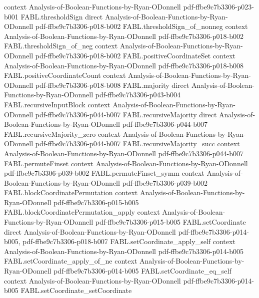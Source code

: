 \begin{theorem}
  {context}
  {Analysis-of-Boolean-Functions-by-Ryan-ODonnell}
  {pdf-ffbe9c7b3306-p023-b001}
\proofstep
  {FABL.thresholdSign}
  {direct}
  {Analysis-of-Boolean-Functions-by-Ryan-ODonnell}
  {pdf-ffbe9c7b3306-p018-b002}
\proofstep
  {FABL.thresholdSign_of_nonneg}
  {context}
  {Analysis-of-Boolean-Functions-by-Ryan-ODonnell}
  {pdf-ffbe9c7b3306-p018-b002}
\proofstep
  {FABL.thresholdSign_of_neg}
  {context}
  {Analysis-of-Boolean-Functions-by-Ryan-ODonnell}
  {pdf-ffbe9c7b3306-p018-b002}
\proofstep
  {FABL.positiveCoordinateSet}
  {context}
  {Analysis-of-Boolean-Functions-by-Ryan-ODonnell}
  {pdf-ffbe9c7b3306-p018-b008}
\proofstep
  {FABL.positiveCoordinateCount}
  {context}
  {Analysis-of-Boolean-Functions-by-Ryan-ODonnell}
  {pdf-ffbe9c7b3306-p018-b008}
\proofstep
  {FABL.majority}
  {direct}
  {Analysis-of-Boolean-Functions-by-Ryan-ODonnell}
  {pdf-ffbe9c7b3306-p043-b004}
\proofstep
  {FABL.recursiveInputBlock}
  {context}
  {Analysis-of-Boolean-Functions-by-Ryan-ODonnell}
  {pdf-ffbe9c7b3306-p044-b007}
\proofstep
  {FABL.recursiveMajority}
  {direct}
  {Analysis-of-Boolean-Functions-by-Ryan-ODonnell}
  {pdf-ffbe9c7b3306-p044-b007}
\proofstep
  {FABL.recursiveMajority_zero}
  {context}
  {Analysis-of-Boolean-Functions-by-Ryan-ODonnell}
  {pdf-ffbe9c7b3306-p044-b007}
\proofstep
  {FABL.recursiveMajority_succ}
  {context}
  {Analysis-of-Boolean-Functions-by-Ryan-ODonnell}
  {pdf-ffbe9c7b3306-p044-b007}
\proofstep
  {FABL.permuteFinset}
  {context}
  {Analysis-of-Boolean-Functions-by-Ryan-ODonnell}
  {pdf-ffbe9c7b3306-p039-b002}
\proofstep
  {FABL.permuteFinset_symm}
  {context}
  {Analysis-of-Boolean-Functions-by-Ryan-ODonnell}
  {pdf-ffbe9c7b3306-p039-b002}
\proofstep
  {FABL.blockCoordinatePermutation}
  {context}
  {Analysis-of-Boolean-Functions-by-Ryan-ODonnell}
  {pdf-ffbe9c7b3306-p015-b005}
\proofstep
  {FABL.blockCoordinatePermutation_apply}
  {context}
  {Analysis-of-Boolean-Functions-by-Ryan-ODonnell}
  {pdf-ffbe9c7b3306-p015-b005}
\proofstep
  {FABL.setCoordinate}
  {direct}
  {Analysis-of-Boolean-Functions-by-Ryan-ODonnell}
  {pdf-ffbe9c7b3306-p014-b005,
    pdf-ffbe9c7b3306-p018-b007}
\proofstep
  {FABL.setCoordinate_apply_self}
  {context}
  {Analysis-of-Boolean-Functions-by-Ryan-ODonnell}
  {pdf-ffbe9c7b3306-p014-b005}
\proofstep
  {FABL.setCoordinate_apply_of_ne}
  {context}
  {Analysis-of-Boolean-Functions-by-Ryan-ODonnell}
  {pdf-ffbe9c7b3306-p014-b005}
\proofstep
  {FABL.setCoordinate_eq_self}
  {context}
  {Analysis-of-Boolean-Functions-by-Ryan-ODonnell}
  {pdf-ffbe9c7b3306-p014-b005}
\proofstep
  {FABL.setCoordinate_setCoordinate}

\end{theorem}
